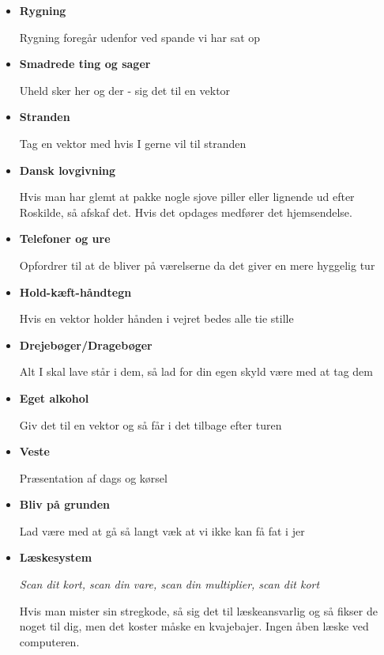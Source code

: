\documentclass[../../../main.tex]{subfiles}
\begin{document}
\begin{itemize}
    \item \textbf{Rygning}
    
    Rygning foregår udenfor ved spande vi har sat op
    
    \item \textbf{Smadrede ting og sager}
    
    Uheld sker her og der - sig det til en vektor
    
    \item \textbf{Stranden}
    
    Tag en vektor med hvis I gerne vil til stranden
    
    \item \textbf{Dansk lovgivning}
    
    Hvis man har glemt at pakke nogle sjove piller eller lignende ud efter Roskilde, så afskaf det. Hvis det opdages medfører det hjemsendelse.
    
    
    \item \textbf{Telefoner og ure}
    
    Opfordrer til at de bliver på værelserne da det giver en mere hyggelig tur
    
    
    \item \textbf{Hold-kæft-håndtegn}
    
    Hvis en vektor holder hånden i vejret bedes alle tie stille
    
    
    \item \textbf{Drejebøger/Dragebøger}
    
    Alt I skal lave står i dem, så lad for din egen skyld være med at tag dem
    
    
    \item \textbf{Eget alkohol}
    
    Giv det til en vektor og så får i det tilbage efter turen
    
    
    \item \textbf{Veste}
    
    Præsentation af dags og kørsel
    
    \item \textbf{Bliv på grunden}
    
    Lad være med at gå så langt væk at vi ikke kan få fat i jer
    
    
    \item \textbf{Læskesystem}
    
    \textit{Scan dit kort, scan din vare, scan din multiplier, scan dit kort}
    
    Hvis man mister sin stregkode, så sig det til læskeansvarlig og så fikser de noget til dig, men det koster måske en kvajebajer. Ingen åben læske ved computeren.
\end{itemize}
\end{document}
